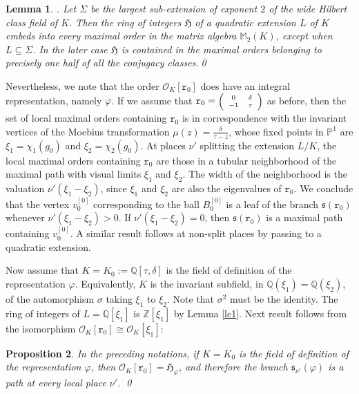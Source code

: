 \documentclass{article}
\newtheorem{Prop}{Proposition}[section]
\newtheorem{Lem}[Prop]{Lemma}
\theoremstyle{definition}
\theoremstyle{remark}
\newcommand\sbmattrix[4]{\textnormal{\scriptsize$\left(\begin{array}{cc}#1&#2\\#3&#4\end{array}\right)$\normalsize}}
\begin{document}
\begin{Lem}\label{lsel}
\textnormal{\cite[Th. 1]{A03}.}
Let $\Sigma$ be the largest sub-extension of 
exponent $2$ of the
wide Hilbert class field of $K$. Then the ring of integers 
$\mathfrak{H}$ of a quadratic extension $L$ of $K$ embeds 
into every maximal order in the matrix algebra 
$\mathbb{M}_2(K)$, except when
$L\subseteq\Sigma$. In the later case 
$\mathfrak{H}$ is contained in the maximal orders
belonging to precisely one half of
all the conjugacy classes.\qed
\end{Lem}

Nevertheless, we note that
the order $\mathcal{O}_K[\mathtt{r}_0]$ does have an integral 
representation, namely $\varphi$. If we assume that
$\mathtt{r}_0=\sbmattrix 0\delta{-1}\tau$ as before, 
then the set of
local maximal orders containing 
$\mathtt{r}_0$ is in correspondence
with the invariant vertices of the Moebius transformation
$\mu(z)=\frac{\delta}{\tau-z}$, whose fixed points in
$\mathbb{P}^1$ are $\xi_1=\chi_1(g_0)$ and 
$\xi_2=\chi_2(g_0)$.
At places $\nu'$ splitting the extension $L/K$, the local
maximal orders containing $\mathtt{r}_0$ are those in a tubular
neighborhood of the maximal path with visual limits $\xi_1$
and $\xi_2$. The width of the neighborhood is the valuation
$\nu'(\xi_1-\xi_2)$, since $\xi_1$ and $\xi_2$ are 
also the eigenvalues of $\mathtt{r}_0$. We conclude that the
vertex $v_0^{[0]}$ corresponding to the ball $B_0^{[0]}$
is a leaf of the branch $\mathfrak{s}(\mathtt{r}_0)$ whenever
$\nu'(\xi_1-\xi_2)>0$. If 
$\nu'(\xi_1-\xi_2)=0$, then $\mathfrak{s}(\mathtt{r}_0)$
is a maximal path containing $v_0^{[0]}$. A similar
result follows at non-split places by passing to a quadratic 
extension.

Now assume that $K=K_0:=\mathbb{Q}[\tau,\delta]$ is the field
of definition of the representation $\varphi$. Equivalently,
$K$ is the invariant subfield, in
$\mathbb{Q}(\xi_1)=\mathbb{Q}(\xi_2)$, of the automorphism
$\sigma$ taking $\xi_1$ to $\xi_2$. Note that $\sigma^2$
must be the identity.
The ring of 
integers of $L=\mathbb{Q}[\xi_1]$ is $\mathbb{Z}[\xi_1]$
by Lemma \ref{lc1}.
Next result follows from the isomorphism 
$\mathcal{O}_K[\mathtt{r}_0]\cong\mathcal{O}_K[\xi_1]$:
\begin{Prop}
    In the preceding notations, if 
    $K=K_0$ is the field of definition of the
    representation $\varphi$, then 
    $\mathcal{O}_K[\mathtt{r}_0]=
    \mathfrak{H}_\varphi$, and therefore the branch 
    $\mathfrak{s}_{\nu'}(\varphi)$ is a path at every 
    local place
    $\nu'$. \qed
\end{Prop}
\end{document}
